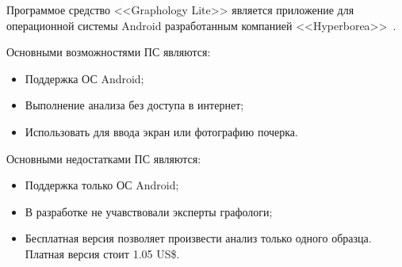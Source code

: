 Программое средство <<Graphology Lite>> является приложение для операционной системы Android разработанным компанией <<Hyperborea>>~\cite{analogs_graphology_sign_analysis}.

Основными возможностями ПС являются:
\begin{itemize}
  \item Поддержка ОС Android;
  \item Выполнение анализа без доступа в интернет;
  \item Использовать для ввода экран или фотографию почерка.
\end{itemize}

Основными недостатками ПС являются:
\begin{itemize}
  \item Поддержка только ОС Android;
  \item В разработке не учавствовали эксперты графологи;
  \item Бесплатная версия позволяет произвести анализ только одного образца. Платная версия стоит 1.05 US\$.
\end{itemize}

